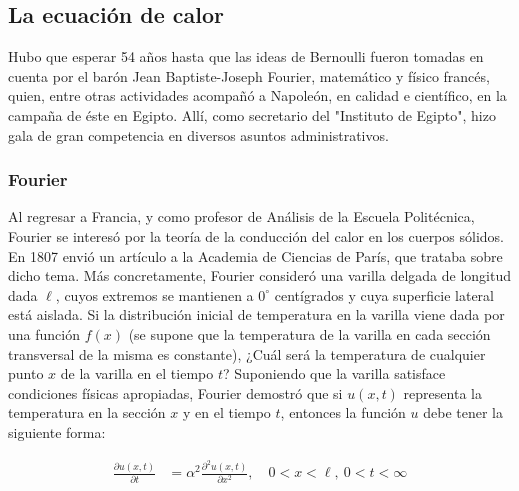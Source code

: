 \subsection{La ecuación de calor}
Hubo que esperar 54 años hasta que las ideas de Bernoulli fueron tomadas en cuenta por el barón Jean Baptiste-Joseph Fourier, matemático y físico francés, quien, entre otras actividades acompañó a Napoleón, en calidad e científico, en la campaña de éste en Egipto. Allí, como secretario del "Instituto de Egipto", hizo gala de gran competencia en diversos asuntos administrativos. ~\cite{almira2017fourier}

\subsubsection{Fourier}
Al regresar a Francia, y como profesor de Análisis de la Escuela Politécnica, Fourier se interesó por la teoría de la conducción del calor en los cuerpos sólidos. En 1807 envió un artículo a la Academia de Ciencias de París, que trataba sobre dicho tema. Más concretamente, Fourier consideró una varilla delgada de longitud dada \( \ell \), cuyos extremos se mantienen a \( 0^\circ \) centígrados y cuya superficie lateral está aislada. Si la distribución inicial de temperatura en la varilla viene dada por una función \( f(x) \) (se supone que la temperatura de la varilla en cada sección transversal de la misma es constante), ¿Cuál será la temperatura de cualquier punto \( x \) de la varilla en el tiempo \( t \)? Suponiendo que la varilla satisface condiciones físicas apropiadas, Fourier demostró que si \( u(x,t) \) representa la temperatura en la sección \( x \) y en el tiempo \( t \), entonces la función \( u \) debe tener la siguiente forma:

\begin{equation} \label{eq12}
	\begin{split}
		\frac{\partial u(x,t)}{\partial t} &= \alpha^2 \frac{\partial^2 u(x,t)}{\partial x^2} , \quad 0 < x < \ell, \ 0 < t < \infty \\
	\end{split}
\end{equation}

